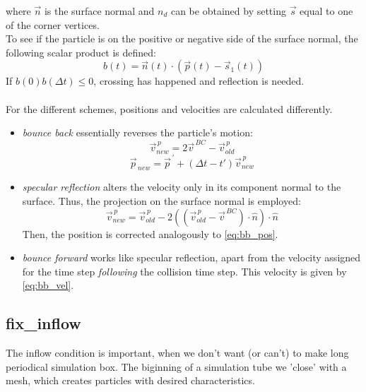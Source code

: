 where $\vec{n}$ is the surface normal and $n_d$ can be obtained by setting $\vec{s}$ equal to one of the corner vertices.\\To see if the particle is on the positive or negative side of the surface normal, the following scalar product is defined:
\begin{equation}
b(t) = \vec{n}(t) \cdot \left( \vec{p}(t) - \vec{s}_1 (t) \right)
\end{equation}
If $b(0)b(\Delta t) \leq 0$, crossing has happened and reflection is needed.\\ \\
For the different schemes, positions and velocities are calculated differently.\\
\begin{itemize}
\item \textit{bounce back} essentially reverses the particle's motion:
\begin{equation}
\label{eq:bb_vel}
\vec{v}^{\,p}_{new} = 2\vec{v}^{\, BC} - \vec{v}^{\,p}_{ old}
\end{equation}
\begin{equation}
\label{eq:bb_pos}
\vec{p}_{\, new} = \vec{p}^{\,'} + \left(\Delta t - t'\right) \vec{v}^{\,p}_{new}
\end{equation}

\item \textit{specular reflection} alters the velocity only in its component normal to the surface. Thus, the projection on the surface normal is employed:
\begin{equation}
\label{sr_vel}
\vec{v}^{\,p}_{new} = \vec{v}^{\,p}_{old} - 2\left(\left(\vec{v}^{\,p}_{old} - \vec{v}^{\, BC}\right) \cdot \hat{n}\right) \cdot \hat{n}
\end{equation}
Then, the position is corrected analogously to \eqref{eq:bb_pos}.

\item \textit{bounce forward} works like specular reflection, apart from the velocity assigned for the time step \textit{following} the collision time step. This velocity is given by \eqref{eq:bb_vel}.
\end{itemize}

\subsection{fix\_inflow}

The inflow condition is important, when we don't want (or can't) to make long periodical simulation box. The biginning of a simulation tube we 'close' with a mesh, which creates particles with desired characteristics.

